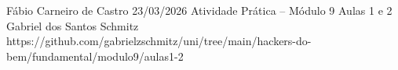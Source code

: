 \documentclass{article}
\begin{document}
{Fábio Carneiro de Castro}
{23/03/2026}
{Atividade Prática -- Módulo 9}
{Aulas 1 e 2}
{Gabriel dos Santos Schmitz}
{https://github.com/gabrielzschmitz/uni/tree/main/hackers-do-bem/fundamental/modulo9/aulas1-2}




\newpage
\printbibliography[title=Referências]
\end{document}
